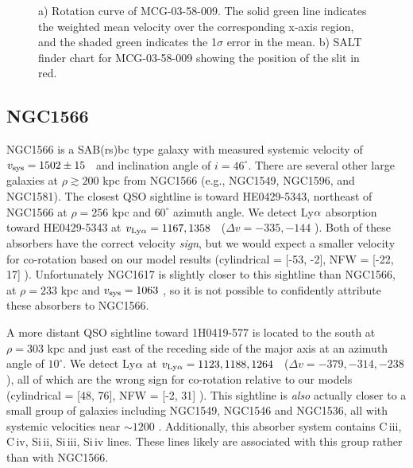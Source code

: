 \begin{figure}[ht]
\centering
  \caption{\small{a) Rotation curve of MCG-03-58-009. The solid green line indicates the weighted mean velocity over the corresponding x-axis region, and the shaded green indicates the 1$\sigma$ error in the mean. b) SALT finder chart for MCG-03-58-009 showing the position of the slit in red.}}
\vspace{0pt}
\end{figure}



\subsection{NGC1566}
NGC1566 is a SAB(rs)bc type galaxy with measured systemic velocity of $v_{\rm sys} = 1502 \pm 15$ \kms~and inclination angle of $i = 46^{\circ}$. There are several other large galaxies at $\rho \gtrsim 200$ kpc from NGC1566 (e.g., NGC1549, NGC1596, and NGC1581). The closest QSO sightline is toward HE0429-5343, northeast of NGC1566 at $\rho = 256$ kpc and $60^{\circ}$ azimuth angle. We detect Ly$\rm \alpha$ absorption toward HE0429-5343 at $v_{\rm Ly\alpha} = 1167, 1358$ \kms~($\Delta v = -335, -144$ \kms). Both of these absorbers have the correct velocity \emph{sign}, but we would expect a smaller velocity for co-rotation based on our model results (cylindrical = [-53, -2], NFW = [-22, 17] \kms). Unfortunately NGC1617 is slightly closer to this sightline than NGC1566, at $\rho = 233$ kpc and $v_{\rm sys} = 1063$ \kms, so it is not possible to confidently attribute these absorbers to NGC1566.

A more distant QSO sightline toward 1H0419-577 is located to the south at $\rho = 303$ kpc and just east of the receding side of the major axis at an azimuth angle of $10^{\circ}$. We detect Ly$\rm \alpha$ at $v_{\rm Ly\alpha} = 1123, 1188, 1264$ \kms~($\Delta v = -379, -314, -238$ \kms), all of which are the wrong sign for co-rotation relative to our models (cylindrical = [48, 76], NFW = [-2, 31] \kms). This sightline is \emph{also} actually closer to a small group of galaxies including NGC1549, NGC1546 and NGC1536, all with systemic velocities near $\sim 1200$ \kms. Additionally, this absorber system contains C\,{\sc iii}, C\,{\sc iv}, Si\,{\sc ii}, Si\,{\sc iii}, Si\,{\sc iv} lines. These lines likely are associated with this group rather than with NGC1566. 

